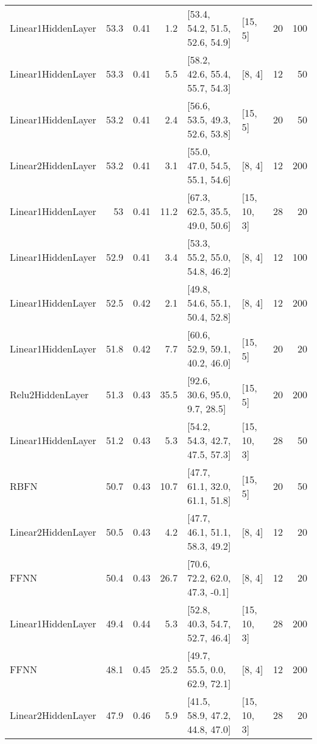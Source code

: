 \begin{table*}
\begin{tabular}{lrrrllrr}
 Linear1HiddenLayer & 53.3 &  0.41 &      1.2 & [53.4, 54.2, 51.5, 52.6, 54.9]  & [15, 5]        &         20 &      100 \\
 Linear1HiddenLayer & 53.3 &  0.41 &      5.5 & [58.2, 42.6, 55.4, 55.7, 54.3]  & [8, 4]         &         12 &       50 \\
 Linear1HiddenLayer & 53.2 &  0.41 &      2.4 & [56.6, 53.5, 49.3, 52.6, 53.8]  & [15, 5]        &         20 &       50 \\
 Linear2HiddenLayer & 53.2 &  0.41 &      3.1 & [55.0, 47.0, 54.5, 55.1, 54.6]  & [8, 4]         &         12 &      200 \\
 Linear1HiddenLayer & 53   &  0.41 &     11.2 & [67.3, 62.5, 35.5, 49.0, 50.6]  & [15, 10, 3]    &         28 &       20 \\
 Linear1HiddenLayer & 52.9 &  0.41 &      3.4 & [53.3, 55.2, 55.0, 54.8, 46.2]  & [8, 4]         &         12 &      100 \\
 Linear1HiddenLayer & 52.5 &  0.42 &      2.1 & [49.8, 54.6, 55.1, 50.4, 52.8]  & [8, 4]         &         12 &      200 \\
 Linear1HiddenLayer & 51.8 &  0.42 &      7.7 & [60.6, 52.9, 59.1, 40.2, 46.0]  & [15, 5]        &         20 &       20 \\
 Relu2HiddenLayer   & 51.3 &  0.43 &     35.5 & [92.6, 30.6, 95.0, 9.7, 28.5]   & [15, 5]        &         20 &      200 \\
 Linear1HiddenLayer & 51.2 &  0.43 &      5.3 & [54.2, 54.3, 42.7, 47.5, 57.3]  & [15, 10, 3]    &         28 &       50 \\
 RBFN               & 50.7 &  0.43 &     10.7 & [47.7, 61.1, 32.0, 61.1, 51.8]  & [15, 5]        &         20 &       50 \\
 Linear2HiddenLayer & 50.5 &  0.43 &      4.2 & [47.7, 46.1, 51.1, 58.3, 49.2]  & [8, 4]         &         12 &       20 \\
 FFNN               & 50.4 &  0.43 &     26.7 & [70.6, 72.2, 62.0, 47.3, -0.1]  & [8, 4]         &         12 &       20 \\
 Linear1HiddenLayer & 49.4 &  0.44 &      5.3 & [52.8, 40.3, 54.7, 52.7, 46.4]  & [15, 10, 3]    &         28 &      200 \\
 FFNN               & 48.1 &  0.45 &     25.2 & [49.7, 55.5, 0.0, 62.9, 72.1]   & [8, 4]         &         12 &      200 \\
 Linear2HiddenLayer & 47.9 &  0.46 &      5.9 & [41.5, 58.9, 47.2, 44.8, 47.0]  & [15, 10, 3]    &         28 &       20 \\

\end{tabular}
\end{table*}
